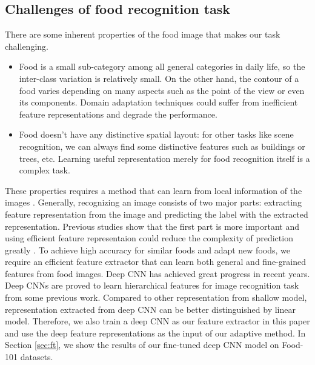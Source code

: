 \subsection{Challenges of food recognition task}
There are some inherent properties of the food image that makes our task challenging.
\begin{itemize}
 \item Food is a small sub-category among all general categories in daily life, so the inter-class variation is relatively small. On the other hand, the contour of a food varies depending on many aspects such as the point of the view or even its components. Domain adaptation techniques could suffer from inefficient feature representations and degrade the performance.
  \item Food doesn't have any distinctive spatial layout: for other tasks like scene recognition, we can always find some distinctive features such as buildings or trees, etc. Learning useful representation merely for food recognition itself is a complex task.
\end{itemize}
These properties requires a method that can learn from local information of the images \cite{bossard2014food}. Generally, recognizing an image consists of two major parts: extracting feature representation from the image and predicting the label with the extracted representation. Previous studies show that the first part is more important and using efficient feature representaion could reduce the complexity of prediction greatly \cite{zeiler2014visualizing} \cite{simonyan2014very}. To achieve high accuracy for similar foods and adapt new foods, we require an efficient feature extractor that can learn both general and fine-grained features from food images. Deep CNN has achieved great progress in recent years. Deep CNNs are proved to learn hierarchical features for image recognition task from some previous work\cite{zeiler2010deconvolutional}\cite{krizhevsky2012imagenet}\cite{CiresanIJCAI11}. Compared to other representation from shallow model, representation extracted from deep CNN can be better distinguished by linear model. Therefore, we also train a deep CNN as our feature extractor in this paper and use the deep feature representations as the input of our adaptive method. In Section \ref{sec:ft}, we show the results of our fine-tuned deep CNN model on Food-101 datasets.

